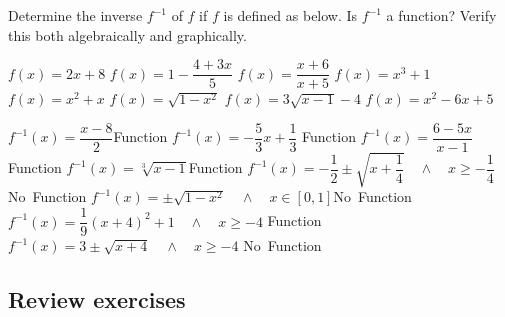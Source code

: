\begin{Exercise} Determine the inverse $f^{-1}$ of $f$ if $f$ is defined as below. Is $f^{-1}$ a function? Verify this both algebraically and graphically.
	\begin{multicols}{2}
		\Question[difficulty = 1] $f(x)=2x+8$
		\Question[difficulty = 1] $f(x)=1-\dfrac{4+3x}{5}$ 
		\Question[difficulty = 1] $f(x)=\dfrac{x+6}{x+5}$
		\Question[difficulty = 1] $f(x)=x^3+1$
		\ifanalysis\Question[difficulty = 1]\fi \ifcalculus\Question[difficulty = 2]\fi $f(x)=x^2+x$ 
		\ifanalysis\Question[difficulty = 1]\fi \ifcalculus\Question[difficulty = 2]\fi $f(x)=\sqrt{1-x^2}$
		\ifanalysis\Question[difficulty = 1]\fi \ifcalculus\Question[difficulty = 2]\fi $f(x)=3 \sqrt{x-1}-4$ 
		\Question[difficulty = 2] $f(x)=x^2-6x+5$  
		\EndCurrentQuestion
   \end{multicols}
\end{Exercise}
  
\begin{Answer}\phantom{}
    
		\Question $f^{-1}(x) = \dfrac{x-8}{2}$\hfill\mbox{Function\hspace{2cm}}
		\Question $f^{-1}(x)=-\dfrac{5}{3}x +\dfrac{1}{3}$ \hfill\mbox{Function\hspace{2cm}}
		\Question $f^{-1}(x) = \dfrac{6-5x}{x-1}$\hfill\mbox{Function\hspace{2cm}}
		\Question $f^{-1}(x) = \sqrt[3]{x-1}$\hfill\mbox{Function\hspace{2cm}}
		\Question $f^{-1}(x) = - \dfrac{1}{2}\pm\sqrt{x + \dfrac{1}{4}} \quad\wedge\quad x \geq - \dfrac{1}{4} $\hfill\mbox{No Function\hspace{2cm}}
		\Question $f^{-1}(x) = \pm\sqrt{1-x^2}\quad\wedge\quad x\in [0,1]$\hfill\mbox{No Function\hspace{2cm}}
		\Question $f^{-1}(x)=\dfrac{1}{9} (x+4)^2+1\quad\wedge\quad x \geq -4 $ \hfill\mbox{Function\hspace{2cm}}
		\Question $f^{-1}(x)=3\pm\sqrt{x+4}\quad\wedge\quad x \geq -4 $ \hfill\mbox{No Function\hspace{2cm}} 
\end{Answer}

\subsection*{Review exercises}

